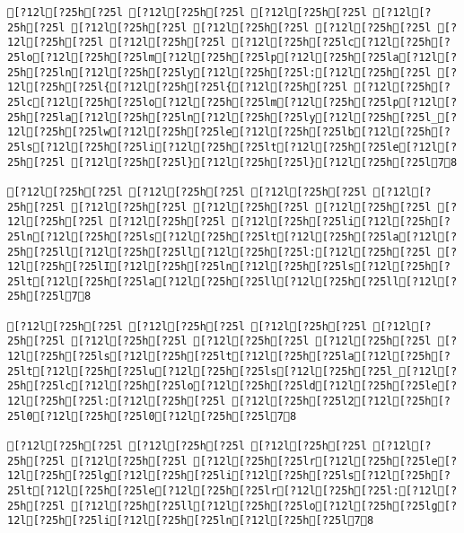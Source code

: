 \documentclass{scrartcl}
\begin{document}
\begin{Verbatim}
[?12l[?25h[?25l [?12l[?25h[?25l [?12l[?25h[?25l [?12l[?25h[?25l [?12l[?25h[?25l [?12l[?25h[?25l [?12l[?25h[?25l [?12l[?25h[?25l [?12l[?25h[?25l [?12l[?25h[?25lc[?12l[?25h[?25lo[?12l[?25h[?25lm[?12l[?25h[?25lp[?12l[?25h[?25la[?12l[?25h[?25ln[?12l[?25h[?25ly[?12l[?25h[?25l:[?12l[?25h[?25l [?12l[?25h[?25l{[?12l[?25h[?25l{[?12l[?25h[?25l [?12l[?25h[?25lc[?12l[?25h[?25lo[?12l[?25h[?25lm[?12l[?25h[?25lp[?12l[?25h[?25la[?12l[?25h[?25ln[?12l[?25h[?25ly[?12l[?25h[?25l_[?12l[?25h[?25lw[?12l[?25h[?25le[?12l[?25h[?25lb[?12l[?25h[?25ls[?12l[?25h[?25li[?12l[?25h[?25lt[?12l[?25h[?25le[?12l[?25h[?25l [?12l[?25h[?25l}[?12l[?25h[?25l}[?12l[?25h[?25l78

[?12l[?25h[?25l [?12l[?25h[?25l [?12l[?25h[?25l [?12l[?25h[?25l [?12l[?25h[?25l [?12l[?25h[?25l [?12l[?25h[?25l [?12l[?25h[?25l [?12l[?25h[?25l [?12l[?25h[?25li[?12l[?25h[?25ln[?12l[?25h[?25ls[?12l[?25h[?25lt[?12l[?25h[?25la[?12l[?25h[?25ll[?12l[?25h[?25ll[?12l[?25h[?25l:[?12l[?25h[?25l [?12l[?25h[?25lI[?12l[?25h[?25ln[?12l[?25h[?25ls[?12l[?25h[?25lt[?12l[?25h[?25la[?12l[?25h[?25ll[?12l[?25h[?25ll[?12l[?25h[?25l78

[?12l[?25h[?25l [?12l[?25h[?25l [?12l[?25h[?25l [?12l[?25h[?25l [?12l[?25h[?25l [?12l[?25h[?25l [?12l[?25h[?25l [?12l[?25h[?25ls[?12l[?25h[?25lt[?12l[?25h[?25la[?12l[?25h[?25lt[?12l[?25h[?25lu[?12l[?25h[?25ls[?12l[?25h[?25l_[?12l[?25h[?25lc[?12l[?25h[?25lo[?12l[?25h[?25ld[?12l[?25h[?25le[?12l[?25h[?25l:[?12l[?25h[?25l [?12l[?25h[?25l2[?12l[?25h[?25l0[?12l[?25h[?25l0[?12l[?25h[?25l78

[?12l[?25h[?25l [?12l[?25h[?25l [?12l[?25h[?25l [?12l[?25h[?25l [?12l[?25h[?25l [?12l[?25h[?25lr[?12l[?25h[?25le[?12l[?25h[?25lg[?12l[?25h[?25li[?12l[?25h[?25ls[?12l[?25h[?25lt[?12l[?25h[?25le[?12l[?25h[?25lr[?12l[?25h[?25l:[?12l[?25h[?25l [?12l[?25h[?25ll[?12l[?25h[?25lo[?12l[?25h[?25lg[?12l[?25h[?25li[?12l[?25h[?25ln[?12l[?25h[?25l78


\end{Verbatim}
\end{document}
